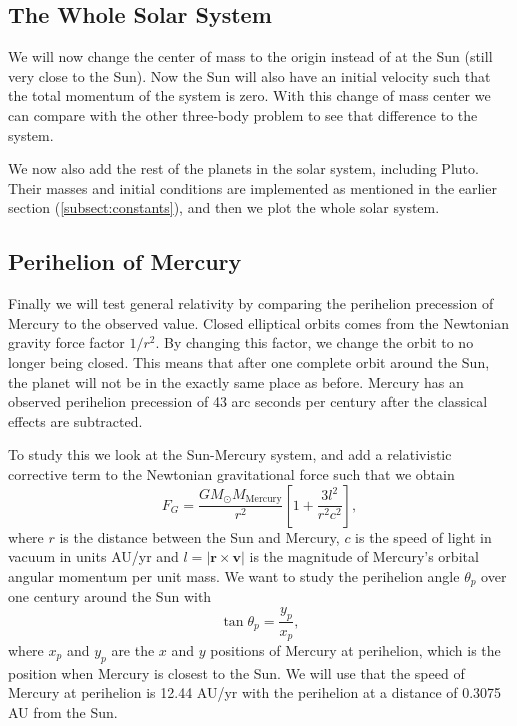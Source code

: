 \documentclass[12pt,a4paper,english]{article}
\begin{document}
\subsection{The Whole Solar System}
\label{eq:SolarSystem}
We will now change the center of mass to the origin instead of at the Sun (still very close to the Sun). Now the Sun will also have an initial velocity such that the total momentum of the system is zero. With this change of mass center we can compare with the other three-body problem to see that difference to the system.

We now also add the rest of the planets in the solar system, including Pluto. Their masses and initial conditions are implemented as mentioned in the earlier section (\ref{subsect:constants}), and then we plot the whole solar system.

\subsection{Perihelion of Mercury}
\label{eq:Mercury}
Finally we will test general relativity by comparing the perihelion precession of Mercury to the observed value. Closed elliptical orbits comes from the Newtonian gravity force factor $1/r^2$. By changing this factor, we change the orbit to no longer being closed. This means that after one complete orbit around the Sun, the planet will not be in the exactly same place as before. Mercury has an observed perihelion precession of 43 arc seconds per century after the classical effects are subtracted. 

To study this we look at the Sun-Mercury system, and add a relativistic corrective term to the Newtonian gravitational force such that we obtain
\begin{equation}
\label{eq:rel_FG}
F_G=\frac{GM_{\odot}M_{\text{Mercury}}}{r^2}\left[1+\frac{3l^2}{r^2c^2}\right],
\end{equation} 
where $r$ is the distance between the Sun and Mercury, $c$ is the speed of light in vacuum in units AU/yr and $l=|\textbf{r}\times \textbf{v}|$ is the magnitude of Mercury's orbital angular momentum per unit mass. We want to study the perihelion angle $\theta_p$ over one century around the Sun with \[\tan\theta_p=\frac{y_p}{x_p},\] where $x_p$ and $y_p$ are the $x$ and $y$ positions of Mercury at perihelion, which is the position when Mercury is closest to the Sun. We will use that the speed of Mercury at perihelion is 12.44 AU/yr with the perihelion at a distance of 0.3075 AU from the Sun.
\end{document}
